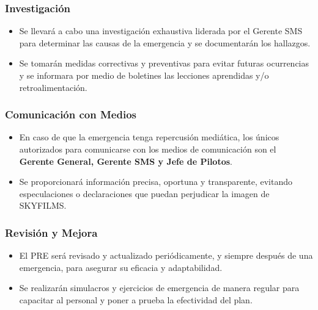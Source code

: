 \subsubsection{Investigación}
\begin{itemize}
    \item Se llevará a cabo una investigación exhaustiva liderada por el Gerente SMS para determinar las causas de la emergencia y se documentarán los hallazgos.
    \item Se tomarán medidas correctivas y preventivas para evitar futuras ocurrencias y se informara por medio de boletines las lecciones aprendidas y/o retroalimentación.
\end{itemize}

\subsubsection{Comunicación con Medios}
\begin{itemize}
    \item En caso de que la emergencia tenga repercusión mediática, los únicos autorizados para comunicarse con los medios de comunicación son el \textbf{Gerente General, Gerente SMS y Jefe de Pilotos}.
    \item Se proporcionará información precisa, oportuna y transparente, evitando especulaciones o declaraciones que puedan perjudicar la imagen de SKYFILMS.
\end{itemize}


\subsubsection{Revisión y Mejora}
\begin{itemize}
    \item El PRE será revisado y actualizado periódicamente, y siempre después de una emergencia, para asegurar su eficacia y adaptabilidad.
    \item Se realizarán simulacros y ejercicios de emergencia de manera regular para capacitar al personal y poner a prueba la efectividad del plan.
\end{itemize}

